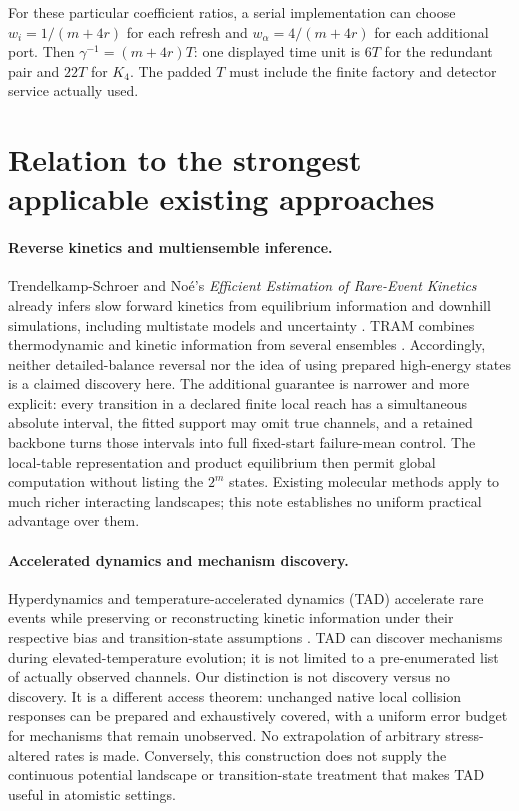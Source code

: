 \documentclass[10pt,a4paper]{article}
\theoremstyle{definition}\newtheorem{assumption}[theorem]{Assumption}
\begin{document}
For these particular coefficient ratios, a serial implementation can choose $w_i=1/(m+4r)$ for each refresh and $w_\alpha=4/(m+4r)$ for each additional port. Then $\gamma^{-1}=(m+4r)T$: one displayed time unit is $6T$ for the redundant pair and $22T$ for $K_4$. The padded $T$ must include the finite factory and detector service actually used.

\section{Relation to the strongest applicable existing approaches}
\label{sec:comparison}

\paragraph{Reverse kinetics and multiensemble inference.}
Trendelkamp-Schroer and No\'e's \emph{Efficient Estimation of Rare-Event Kinetics} already infers slow forward kinetics from equilibrium information and downhill simulations, including multistate models and uncertainty \cite{prx2016}. TRAM combines thermodynamic and kinetic information from several ensembles \cite{tram}. Accordingly, neither detailed-balance reversal nor the idea of using prepared high-energy states is a claimed discovery here. The additional guarantee is narrower and more explicit: every transition in a declared finite local reach has a simultaneous absolute interval, the fitted support may omit true channels, and a retained backbone turns those intervals into full fixed-start failure-mean control. The local-table representation and product equilibrium then permit global computation without listing the $2^m$ states. Existing molecular methods apply to much richer interacting landscapes; this note establishes no uniform practical advantage over them.

\paragraph{Accelerated dynamics and mechanism discovery.}
Hyperdynamics and temperature-accelerated dynamics (TAD) accelerate rare events while preserving or reconstructing kinetic information under their respective bias and transition-state assumptions \cite{hyper,tad,tadmath}. TAD can discover mechanisms during elevated-temperature evolution; it is not limited to a pre-enumerated list of actually observed channels. Our distinction is not discovery versus no discovery. It is a different access theorem: unchanged native local collision responses can be prepared and exhaustively covered, with a uniform error budget for mechanisms that remain unobserved. No extrapolation of arbitrary stress-altered rates is made. Conversely, this construction does not supply the continuous potential landscape or transition-state treatment that makes TAD useful in atomistic settings.
\end{document}
